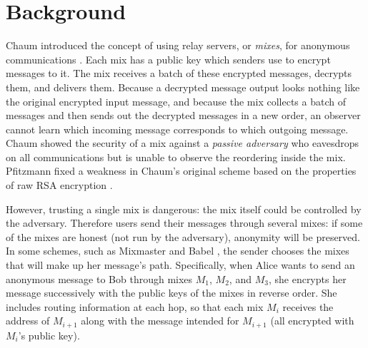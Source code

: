 \documentclass[11pt]{IEEEtran}
\begin{document}




\section{Background}
\label{sec:background}

Chaum introduced the concept of using relay servers, or \emph{mixes},
for anonymous communications \cite{chaum-mix}. Each mix has a public key
which senders use to encrypt messages to it. The mix receives a batch
of these encrypted messages, decrypts them, and delivers them. Because
a decrypted message output looks nothing like the original encrypted
input message,
and because the mix collects a batch of messages and then sends out the
decrypted messages in a new order, an observer cannot learn which incoming
message corresponds to which outgoing message. Chaum showed the
security of a mix against a \emph{passive adversary} who eavesdrops on
all communications but is unable to observe the reordering inside the mix.
Pfitzmann fixed a weakness in Chaum's original scheme based on the
properties of raw RSA encryption \cite{pfitzmann90how}.

However, trusting a single mix is dangerous: the mix itself could be
controlled by the adversary. Therefore users send their messages through
several mixes: if some of the mixes are honest (not run by the adversary),
anonymity will be preserved. In some schemes, such as Mixmaster
\cite{mixmaster-spec} and Babel \cite{babel}, the sender chooses the
mixes that will make up her message's path. Specifically, when Alice
wants to send an anonymous message to Bob through mixes $M_1$, $M_2$,
and $M_3$, she encrypts her message successively with the public keys of
the mixes in reverse order. She includes routing information at each hop,
so that each mix $M_i$ receives the address of $M_{i+1}$ along with the
message intended for $M_{i+1}$ (all encrypted with $M_i$'s public key).
\end{document}

